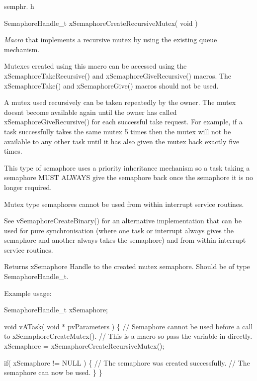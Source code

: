 semphr. h 
\begin{DoxyPre}SemaphoreHandle\_t xSemaphoreCreateRecursiveMutex( void )\end{DoxyPre}


{\itshape Macro} that implements a recursive mutex by using the existing queue mechanism.

Mutexes created using this macro can be accessed using the x\+Semaphore\+Take\+Recursive() and x\+Semaphore\+Give\+Recursive() macros. The x\+Semaphore\+Take() and x\+Semaphore\+Give() macros should not be used.

A mutex used recursively can be \textquotesingle{}taken\textquotesingle{} repeatedly by the owner. The mutex doesn\textquotesingle{}t become available again until the owner has called x\+Semaphore\+Give\+Recursive() for each successful \textquotesingle{}take\textquotesingle{} request. For example, if a task successfully \textquotesingle{}takes\textquotesingle{} the same mutex 5 times then the mutex will not be available to any other task until it has also \textquotesingle{}given\textquotesingle{} the mutex back exactly five times.

This type of semaphore uses a priority inheritance mechanism so a task \textquotesingle{}taking\textquotesingle{} a semaphore M\+U\+S\+T A\+L\+W\+A\+Y\+S \textquotesingle{}give\textquotesingle{} the semaphore back once the semaphore it is no longer required.

Mutex type semaphores cannot be used from within interrupt service routines.

See v\+Semaphore\+Create\+Binary() for an alternative implementation that can be used for pure synchronisation (where one task or interrupt always \textquotesingle{}gives\textquotesingle{} the semaphore and another always \textquotesingle{}takes\textquotesingle{} the semaphore) and from within interrupt service routines.

\begin{DoxyReturn}{Returns}
x\+Semaphore Handle to the created mutex semaphore. Should be of type Semaphore\+Handle\+\_\+t.
\end{DoxyReturn}
Example usage\+: 
\begin{DoxyPre}
SemaphoreHandle\_t xSemaphore;\end{DoxyPre}



\begin{DoxyPre}void vATask( void * pvParameters )
\{
   // Semaphore cannot be used before a call to xSemaphoreCreateMutex().
   // This is a macro so pass the variable in directly.
   xSemaphore = xSemaphoreCreateRecursiveMutex();\end{DoxyPre}



\begin{DoxyPre}   if( xSemaphore != NULL )
   \{
       // The semaphore was created successfully.
       // The semaphore can now be used.
   \}
\}
\end{DoxyPre}
 